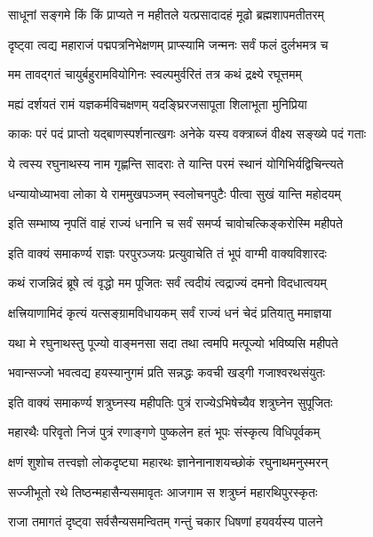 \twolineshloka
{साधूनां सङ्गमे किं किं प्राप्यते न महीतले}
{यत्प्रसादादहं मूढो ब्रह्मशापमतीतरम्}%

\twolineshloka
{दृष्ट्वा त्वद्य महाराजं पद्मपत्रनिभेक्षणम्}
{प्राप्स्यामि जन्मनः सर्वं फलं दुर्लभमत्र च}%

\twolineshloka
{मम तावद्गतं चायुर्बहुरामवियोगिनः}
{स्वल्पमुर्वरितं तत्र कथं द्रक्ष्ये रघूत्तमम्}%

\twolineshloka
{मह्यं दर्शयतं रामं यज्ञकर्मविचक्षणम्}
{यदङ्घ्रिरजसापूता शिलाभूता मुनिप्रिया}%

\twolineshloka
{काकः परं पदं प्राप्तो यद्बाणस्पर्शनात्खगः}
{अनेके यस्य वक्त्राब्जं वीक्ष्य सङ्ख्ये पदं गताः}%

\twolineshloka
{ये त्वस्य रघुनाथस्य नाम गृह्णन्ति सादराः}
{ते यान्ति परमं स्थानं योगिभिर्यद्विचिन्त्यते}%

\twolineshloka
{धन्यायोध्याभवा लोका ये राममुखपञ्जम्}
{स्वलोचनपुटैः पीत्वा सुखं यान्ति महोदयम्}%

\twolineshloka
{इति सम्भाष्य नृपतिं वाहं राज्यं धनानि च}
{सर्वं समर्प्य चावोचत्किङ्करोस्मि महीपते}%

\twolineshloka
{इति वाक्यं समाकर्ण्य राज्ञः परपुरञ्जयः}
{प्रत्युवाचेति तं भूपं वाग्मी वाक्यविशारदः}%


\twolineshloka
{कथं राजन्निदं ब्रूषे त्वं वृद्धो मम पूजितः}
{सर्वं त्वदीयं त्वद्राज्यं दमनो विदधात्वयम्}%

\twolineshloka
{क्षत्त्रियाणामिदं कृत्यं यत्सङ्ग्रामविधायकम्}
{सर्वं राज्यं धनं चेदं प्रतियातु ममाज्ञया}%

\twolineshloka
{यथा मे रघुनाथस्तु पूज्यो वाङ्मनसा सदा}
{तथा त्वमपि मत्पूज्यो भविष्यसि महीपते}%

\twolineshloka
{भवान्सज्जो भवत्वद्य हयस्यानुगमं प्रति}
{सन्नद्धः कवची खड्गी गजाश्वरथसंयुतः}%

\twolineshloka
{इति वाक्यं समाकर्ण्य शत्रुघ्नस्य महीपतिः}
{पुत्रं राज्येऽभिषेच्यैव शत्रुघ्नेन सुपूजितः}%

\twolineshloka
{महारथैः परिवृतो निजं पुत्रं रणाङ्गणे}
{पुष्कलेन हतं भूपः संस्कृत्य विधिपूर्वकम्}%

\twolineshloka
{क्षणं शुशोच तत्त्वज्ञो लोकदृष्ट्या महारथः}
{ज्ञानेनानाशयच्छोकं रघुनाथमनुस्मरन्}%

\twolineshloka
{सज्जीभूतो रथे तिष्ठन्महासैन्यसमावृतः}
{आजगाम स शत्रुघ्नं महारथिपुरस्कृतः}%

\twolineshloka
{राजा तमागतं दृष्ट्वा सर्वसैन्यसमन्वितम्}
{गन्तुं चकार धिषणां हयवर्यस्य पालने}%

